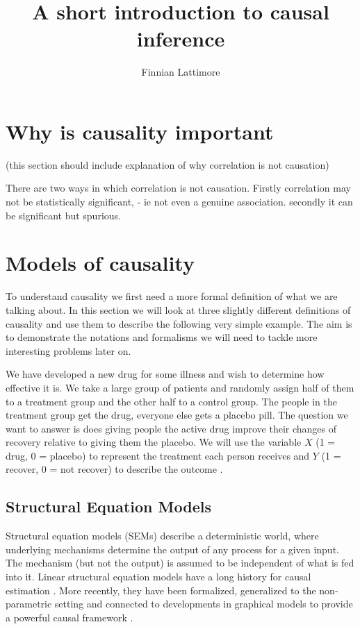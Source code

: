 \documentclass[11pt,a4paper]{article}
\author{Finnian Lattimore}
\title{A short introduction to causal inference}
\begin{document}
\def\ci{\perp\!\!\!\perp} %
\newtheorem{theorem}{Theorem}[section]
\newtheorem{definition}{Definition}[section]


\section{Why is causality important}

(this section should include explanation of why correlation is not causation)

There are two ways in which correlation is not causation. Firstly correlation may not be statistically significant, - ie not even a genuine association. secondly it can be significant but spurious. 


\section{Models of causality}
\label{sec:causalmodels}
To understand causality we first need a more formal definition of what we are talking about. In this section we will look at three slightly different definitions of causality and use them to describe the following very simple example. The aim is to demonstrate the notations and formalisms we will need to tackle more interesting problems later on.

We have developed a new drug for some illness and wish to determine how effective it is. We take a large group of patients and randomly assign half of them to a treatment group and the other half to a control group. The people in the treatment group get the drug, everyone else gets a placebo pill. The question we want to answer is does giving people the active drug improve their changes of recovery relative to giving them the placebo. We will use the variable $X$ (1 = drug, 0 = placebo) to represent the treatment each person receives and $Y$ (1 = recover, 0 = not recover) to describe the outcome .
\subsection{Structural Equation Models}
\label{sec:SEM}
Structural equation models (SEMs) describe a deterministic world, where underlying mechanisms determine the output of any process for a given input. The mechanism (but not the output) is assumed to be independent of what is fed into it. Linear structural equation models have a long history for causal estimation \cite {Wright1921,Haavelmo1943}. More recently, they have been formalized, generalized to the non-parametric setting and connected to developments in graphical models to provide a powerful causal framework \cite{Pearl2000}.
\end{document}
